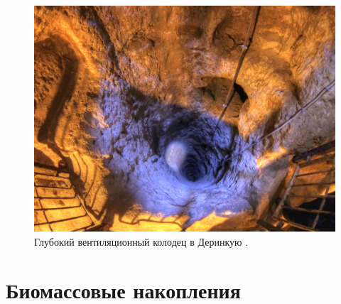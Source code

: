 \documentclass[10pt,twocolumn,letterpaper]{article}
\begin{document}
\begin{figure}[t]
\begin{center}
   \includegraphics[width=1\linewidth]{derinkuyu-air.jpg}
\end{center}
   \caption{Глубокий вентиляционный колодец в Деринкую \cite{53}.}
\label{fig:6}
\label{fig:onecol}
\end{figure}


\section{Биомассовые накопления}
\end{document}
